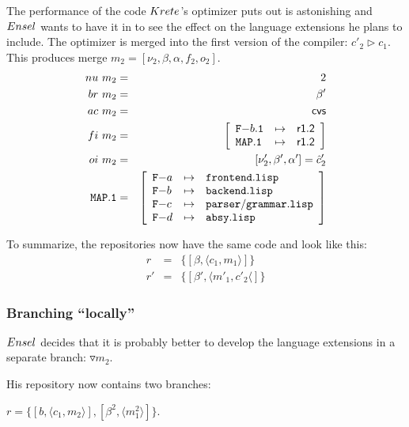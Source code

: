\documentclass[fleqn, 10pt, a4paper]{article}
\begin{document}
The performance of the code $\mathnormal{Krete}$'s optimizer puts out is
astonishing and $\mathnormal{Ensel}$ wants to have it in to see the effect
on the language extensions he plans to include. The optimizer is
merged into the first version of the compiler: $c'_2 \rhd c_1$. This
produces merge $m_2=[\nu_2, \beta, \alpha, f_2, o_2]$.
\begin{eqnarray*}
\mathnormal{nu}\ m_2 &=& 2 \\
\mathnormal{br}\ m_2 &=& \beta' \\
\mathnormal{ac}\ m_2 &=& \mathsf{cvs} \\
\mathnormal{fi}\ m_2 &=& \left[
\begin{array}{lcl}
\mathtt{F-}b\mathtt{.1} & \mapsto & \mathsf{r1.2} \\
\mathtt{MAP.1}         & \mapsto & \mathsf{r1.2} \\
\end{array}\right] \\
\mathnormal{oi}\ m_2 &=& [\nu'_2, \beta', \alpha'] = \hat c'_2 \\
\mathtt{MAP.1} &=& \left[
\begin{array}{lcl}
\mathtt{F-}a &\mapsto& \mathtt{frontend.lisp} \\
\mathtt{F-}b &\mapsto& \mathtt{backend.lisp} \\
\mathtt{F-}c &\mapsto& \mathtt{parser/grammar.lisp} \\
\mathtt{F-}d &\mapsto& \mathtt{absy.lisp} \\
\end{array}\right]
\end{eqnarray*}

\medskip
To summarize, the repositories now have the same code and look like this:
\begin{eqnarray*}
r  &=& \{[\beta, \langle c_1, m_1\rangle]\} \\
r' &=& \{[\beta', \langle m'_1, c'_2\langle]\}
\end{eqnarray*}

\subsubsection{Branching ``locally''}

$\mathnormal{Ensel}$ decides that it is probably better to develop
the language extensions in a separate branch: $\triangledown m_2$.

His repository now contains two branches:

$r=\{[b, \langle c_1, m_2\rangle], [\beta^2, \langle m_1^2 \rangle]\}$.
\end{document}
